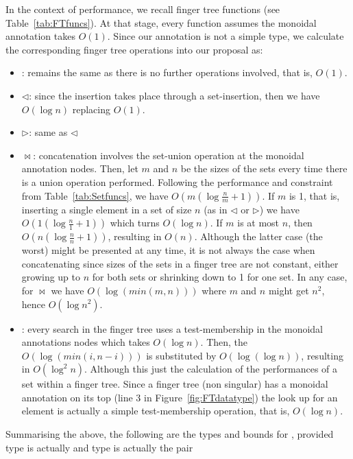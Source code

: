 In the context of performance, we recall finger tree functions (see Table~\ref{tab:FTfuncs}). At that stage, every function assumes the monoidal annotation takes $O(1)$. Since our annotation is not a simple type, we calculate the corresponding finger tree operations into our \dyntset proposal as:
\begin{itemize}
\item {}: remains the same as there is no further operations involved, that is, $O(1)$.
\item $\lhd$: since the insertion takes place through a set-insertion, then we have $O(\log n)$ replacing $O(1)$.
\item $\rhd$: same as $\lhd$
\item $\bowtie$: concatenation involves the set-union operation at the monoidal annotation nodes. Then, let $m$ and $n$ be the sizes of the sets every time there is a union operation performed. Following the performance and constraint from Table~\ref{tab:Setfuncs}, we have $O(m(\log\frac{n}{m} +1))$. If $m$ is 1, that is, inserting a single element in a set of size $n$ (as in $\lhd$ or $\rhd$) we have $O(1(\log\frac{n}{1} +1))$ which turns $O(\log n)$. If $m$ is at most $n$, then $O(n(\log\frac{n}{n} +1))$, resulting in $O(n)$. Although the latter case (the worst) might be presented at any time, it is not always the case when concatenating since sizes of the sets in a finger tree are not constant, either growing up to $n$ for both sets or shrinking down to 1 for one set. In any case, for $\bowtie$ we have $O(\log(min(m,n)))$ where $m$ and $n$ might get $n^2$, hence $O(\log n^2)$.
\item {}: every search in the finger tree uses a test-membership in the monoidal annotations nodes which takes $O(\log n)$. Then, the $O(\log(min(i,n-i)))$ is substituted by $O(\log (\log n))$, resulting in $O(\log^2 n)$. Although this just the calculation of the performances of a set within a finger tree. Since a finger tree (non singular) has a monoidal annotation on its top (line 3 in Figure~\ref{fig:FTdatatype}) the look up for an element is actually a simple test-membership operation, that is, $O(\log n)$. 
\end{itemize}

Summarising the above, the following are the types and bounds for \dyntset, provided type  is actually  and type  is actually the pair 

